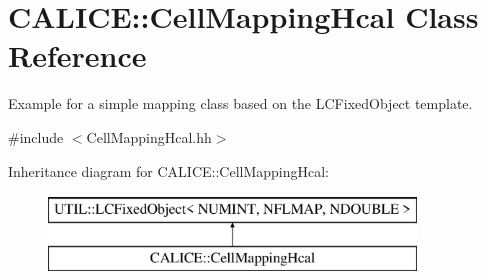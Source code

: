 \section{C\-A\-L\-I\-C\-E\-:\-:Cell\-Mapping\-Hcal Class Reference}
\label{classCALICE_1_1CellMappingHcal}


Example for a simple mapping class based on the L\-C\-Fixed\-Object template.  




{\ttfamily \#include $<$Cell\-Mapping\-Hcal.\-hh$>$}

Inheritance diagram for C\-A\-L\-I\-C\-E\-:\-:Cell\-Mapping\-Hcal\-:\begin{figure}[H]
\begin{center}
\leavevmode
\includegraphics[height=2.000000cm]{classCALICE_1_1CellMappingHcal}
\end{center}
\end{figure}
